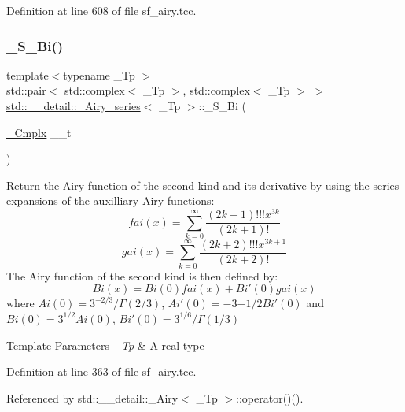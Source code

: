 Definition at line 608 of file sf\+\_\+airy.\+tcc.

\mbox{\label{classstd_1_1____detail_1_1__Airy__series_ac983d76e4cf469930d6712bf2d2caa1f}} 
\subsubsection{\texorpdfstring{\+\_\+\+S\+\_\+\+Bi()}{\_S\_Bi()}}
{\footnotesize\ttfamily template$<$typename \+\_\+\+Tp $>$ \\
std\+::pair$<$ std\+::complex$<$ \+\_\+\+Tp $>$, std\+::complex$<$ \+\_\+\+Tp $>$ $>$ \hyperlink{classstd_1_1____detail_1_1__Airy__series}{std\+::\+\_\+\+\_\+detail\+::\+\_\+\+Airy\+\_\+series}$<$ \+\_\+\+Tp $>$\+::\+\_\+\+S\+\_\+\+Bi (\begin{DoxyParamCaption}\item[{\hyperlink{classstd_1_1____detail_1_1__Airy__series_ab41161caa54609f4735987fbaed41d9d}{\+\_\+\+Cmplx}}]{\+\_\+\+\_\+t }\end{DoxyParamCaption})\hspace{0.3cm}{\ttfamily [static]}}

Return the Airy function of the second kind and its derivative by using the series expansions of the auxilliary Airy functions\+: \[ fai(x) = \sum_{k=0}^\infty \frac{(2k+1)!!!x^{3k}}{(2k+1)!} \] \[ gai(x) = \sum_{k=0}^\infty \frac{(2k+2)!!!x^{3k+1}}{(2k+2)!} \] The Airy function of the second kind is then defined by\+: \[ Bi(x) = Bi(0)fai(x) + Bi'(0)gai(x) \] where $ Ai(0) = 3^{-2/3}/\Gamma(2/3) $, $ Ai'(0) = -3{-1/2}Bi'(0) $ and $ Bi(0) = 3^{1/2}Ai(0) $, $ Bi'(0) = 3^{1/6}/\Gamma(1/3) $


\begin{DoxyTemplParams}{Template Parameters}
{\em \+\_\+\+Tp} & A real type \\
\hline
\end{DoxyTemplParams}


Definition at line 363 of file sf\+\_\+airy.\+tcc.



Referenced by std\+::\+\_\+\+\_\+detail\+::\+\_\+\+Airy$<$ \+\_\+\+Tp $>$\+::operator()().

